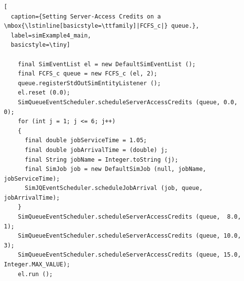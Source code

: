\documentclass[12pt]{book}
\begin{document}
\begin{lstlisting}[
  caption={Setting Server-Access Credits on a \mbox{\lstinline[basicstyle=\ttfamily]|FCFS_c|} queue.},
  label=simExample4_main,
  basicstyle=\tiny]

    final SimEventList el = new DefaultSimEventList ();
    final FCFS_c queue = new FCFS_c (el, 2);
    queue.registerStdOutSimEntityListener ();
    el.reset (0.0);
    SimQueueEventScheduler.scheduleServerAccessCredits (queue, 0.0, 0);
    for (int j = 1; j <= 6; j++)
    {
      final double jobServiceTime = 1.05;
      final double jobArrivalTime = (double) j;
      final String jobName = Integer.toString (j);
      final SimJob job = new DefaultSimJob (null, jobName, jobServiceTime);
      SimJQEventScheduler.scheduleJobArrival (job, queue, jobArrivalTime);
    }
    SimQueueEventScheduler.scheduleServerAccessCredits (queue,  8.0, 1);
    SimQueueEventScheduler.scheduleServerAccessCredits (queue, 10.0, 3);
    SimQueueEventScheduler.scheduleServerAccessCredits (queue, 15.0, Integer.MAX_VALUE);
    el.run ();

\end{lstlisting}
  
\end{document}

